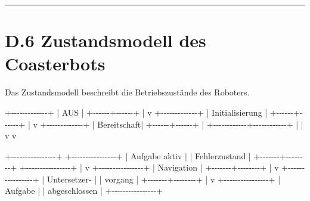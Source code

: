 \documentclass[
]{article}
\newenvironment{Shaded}{}{}
\newcommand{\NormalTok}[1]{#1}
\begin{document}
\begin{center}\rule{0.5\linewidth}{0.5pt}\end{center}

\section{D.6 Zustandsmodell des
Coasterbots}\label{d.6-zustandsmodell-des-coasterbots}

Das Zustandsmodell beschreibt die Betriebszustände des Roboters.

\begin{Shaded}
\begin{Highlighting}[]
\NormalTok{                +{-}{-}{-}{-}{-}{-}{-}{-}{-}{-}{-}{-}{-}+}
\NormalTok{                | AUS         |}
\NormalTok{                +{-}{-}{-}{-}{-}{-}+{-}{-}{-}{-}{-}{-}+}
\NormalTok{                       |}
\NormalTok{                       v}
\NormalTok{                +{-}{-}{-}{-}{-}{-}{-}{-}{-}{-}{-}{-}{-}+}
\NormalTok{                | Initialisierung |}
\NormalTok{                +{-}{-}{-}{-}{-}{-}+{-}{-}{-}{-}{-}{-}+}
\NormalTok{                       |}
\NormalTok{                       v}
\NormalTok{                +{-}{-}{-}{-}{-}{-}{-}{-}{-}{-}{-}{-}{-}+}
\NormalTok{                | Bereitschaft|}
\NormalTok{                +{-}{-}{-}{-}{-}{-}+{-}{-}{-}{-}{-}{-}+}
\NormalTok{                       |}
\NormalTok{          +{-}{-}{-}{-}{-}{-}{-}{-}{-}{-}{-}{-}+{-}{-}{-}{-}{-}{-}{-}{-}{-}{-}{-}{-}+}
\NormalTok{          |                         |}
\NormalTok{          v                         v}

\NormalTok{+{-}{-}{-}{-}{-}{-}{-}{-}{-}{-}{-}{-}{-}{-}{-}{-}+        +{-}{-}{-}{-}{-}{-}{-}{-}{-}{-}{-}{-}{-}{-}{-}{-}+}
\NormalTok{| Aufgabe aktiv  |        | Fehlerzustand  |}
\NormalTok{+{-}{-}{-}{-}{-}{-}{-}+{-}{-}{-}{-}{-}{-}{-}{-}+        +{-}{-}{-}{-}{-}{-}{-}{-}{-}{-}{-}{-}{-}{-}{-}{-}+}
\NormalTok{        |}
\NormalTok{        v}
\NormalTok{+{-}{-}{-}{-}{-}{-}{-}{-}{-}{-}{-}{-}{-}{-}{-}{-}+}
\NormalTok{| Navigation     |}
\NormalTok{+{-}{-}{-}{-}{-}{-}{-}+{-}{-}{-}{-}{-}{-}{-}{-}+}
\NormalTok{        |}
\NormalTok{        v}
\NormalTok{+{-}{-}{-}{-}{-}{-}{-}{-}{-}{-}{-}{-}{-}{-}{-}{-}+}
\NormalTok{| Untersetzer{-}   |}
\NormalTok{| vorgang        |}
\NormalTok{+{-}{-}{-}{-}{-}{-}{-}+{-}{-}{-}{-}{-}{-}{-}{-}+}
\NormalTok{        |}
\NormalTok{        v}
\NormalTok{+{-}{-}{-}{-}{-}{-}{-}{-}{-}{-}{-}{-}{-}{-}{-}{-}+}
\NormalTok{| Aufgabe        |}
\NormalTok{| abgeschlossen  |}
\NormalTok{+{-}{-}{-}{-}{-}{-}{-}{-}{-}{-}{-}{-}{-}{-}{-}{-}+}
\end{Highlighting}
\end{Shaded}
\end{document}
